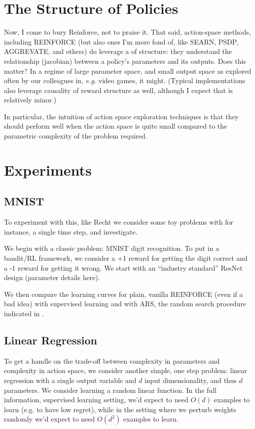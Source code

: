\documentclass{article}
\begin{document}
\section{The Structure of Policies}
 
Now, I come to bury Reinforce, not to praise it. That said, action-space methods, including REINFORCE (but also ones I'm more fond of, like SEARN, PSDP, AGGREVATE, and others)   
do leverage a  of structure: they understand the relationship (jacobian) between a policy's parameters and its outputs.  
Does this matter? In a regime of large parameter space, and small output space as explored often by our colleagues in, \textit{e.g.} video games, it might.
(Typical implementations also leverage causality of reward structure as well, although I expect that is relatively minor.)

In particular, the intuition of action space exploration techniques is that they should perform well when the action space is quite small compared to the parametric complexity
of the problem required.

\section{Experiments}

\subsection{MNIST}

To experiment with this, like Recht we consider some toy problems with for instance, a single time step, and investigate.

We begin with a classic problem: MNIST digit recognition. To put in a bandit/RL framework, we consider a +1 reward for getting the digit correct and
a -1 reward for getting it wrong. We start with an ``industry standard'' ResNet design (parameter details here).

We then compare the learning curves for plain, vanilla REINFORCE (even if a bad idea) with supervised learning and with ARS, the random search procedure indicated in \cite{Mania}.




\subsection{Linear Regression}

To get a handle on the trade-off between complexity in parameters and complexity in action space, we consider another simple, one step problem: linear regression
with a single output variable and $d$ input dimensionality, and thus $d$ parameters. We consider learning a random linear function. In the full information, supervised learning
setting, we'd expect to need $O(d)$ examples to learn (e.g. to have low regret), while in the setting where we perturb weights randomly \cite{Flaxman} we'd expect to need $O(d^2)$
examples to learn.
\end{document}
